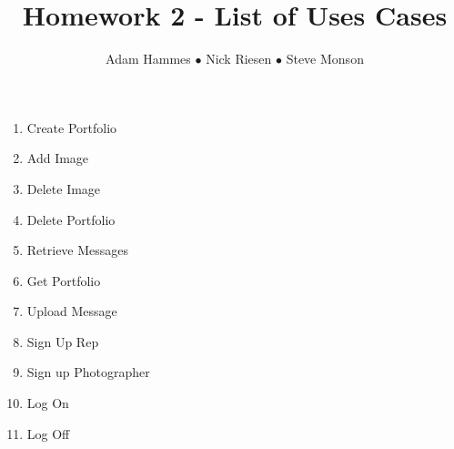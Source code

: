 \documentclass{article}
\title{Homework 2 - List of Uses Cases}
\author{Adam Hammes $\bullet$ Nick Riesen $\bullet$ Steve Monson}
\begin{document}
\maketitle

\begin{enumerate}
    \item Create Portfolio
    \item Add Image
    \item Delete Image
    \item Delete Portfolio
    \item Retrieve Messages
    \item Get Portfolio
    \item Upload Message
    \item Sign Up Rep
    \item Sign up Photographer
    \item Log On
    \item Log Off
\end{enumerate}
\end{document}
